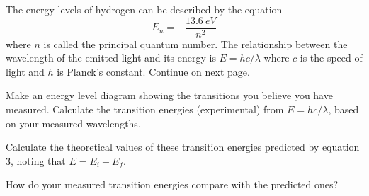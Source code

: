  
The energy levels of hydrogen can be described by the equation
\begin{equation}
E_n = -\frac{13.6~eV}{n^2}
\end{equation}
where $n$ is called the principal quantum number.
The relationship between the wavelength of the emitted light and its energy
is $E=hc/\lambda$ where $c$ is the speed of light and $h$ is Planck's constant.
Continue on next page.

\eject

Make an energy level diagram showing the transitions you believe you have measured. Calculate the transition energies (experimental) from $E=hc/\lambda$, based on your measured wavelengths.

\vspace{3.0in}

Calculate the theoretical values of these transition energies predicted by equation 3, noting that $E = E_i - E_f$.

\vspace{3.0in}

How do your measured transition energies compare with the predicted ones?

